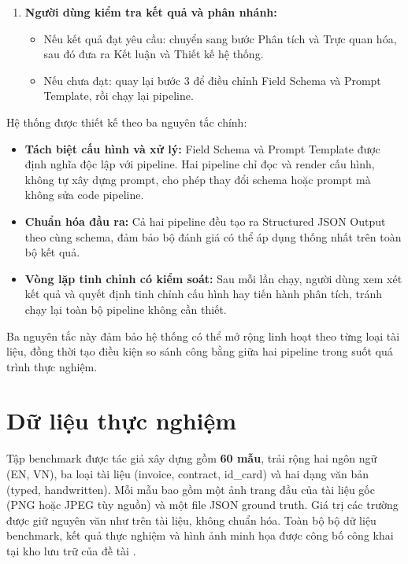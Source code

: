 ﻿\documentclass[12pt]{report}
\begin{document}
\begin{enumerate}
    \item \textbf{Người dùng kiểm tra kết quả và phân nhánh:}
    \begin{itemize}
        \item Nếu kết quả đạt yêu cầu: chuyển sang bước Phân tích và Trực quan hóa, sau đó đưa ra Kết luận và Thiết kế hệ thống.
        \item Nếu chưa đạt: quay lại bước 3 để điều chỉnh Field Schema và Prompt Template, rồi chạy lại pipeline.
    \end{itemize}
\end{enumerate}

Hệ thống được thiết kế theo ba nguyên tắc chính:

\begin{itemize}
    \item \textbf{Tách biệt cấu hình và xử lý:} Field Schema và Prompt Template được định nghĩa độc lập với pipeline. Hai pipeline chỉ đọc và render cấu hình, không tự xây dựng prompt, cho phép thay đổi schema hoặc prompt mà không sửa code pipeline.

    \item \textbf{Chuẩn hóa đầu ra:} Cả hai pipeline đều tạo ra Structured JSON Output theo cùng schema, đảm bảo bộ đánh giá có thể áp dụng thống nhất trên toàn bộ kết quả.

    \item \textbf{Vòng lặp tinh chỉnh có kiểm soát:} Sau mỗi lần chạy, người dùng xem xét kết quả và quyết định tinh chỉnh cấu hình hay tiến hành phân tích, tránh chạy lại toàn bộ pipeline không cần thiết.
\end{itemize}

Ba nguyên tắc này đảm bảo hệ thống có thể mở rộng linh hoạt theo từng loại tài liệu, đồng thời tạo điều kiện so sánh công bằng giữa hai pipeline trong suốt quá trình thực nghiệm.

\section{Dữ liệu thực nghiệm}\label{sec:datasets}

Tập benchmark được tác giả xây dựng gồm \textbf{60 mẫu}, trải rộng hai ngôn ngữ (EN, VN),
ba loại tài liệu (invoice, contract, id\_card) và hai dạng văn bản (typed, handwritten).
Mỗi mẫu bao gồm một ảnh trang đầu của tài liệu gốc (PNG hoặc JPEG tùy nguồn) và một file JSON ground truth.
Giá trị các trường được giữ nguyên văn như trên tài liệu, không chuẩn hóa. Toàn bộ bộ dữ liệu
benchmark, kết quả thực nghiệm và hình ảnh minh họa được công bố công khai tại kho lưu trữ của
đề tài \cite{pham2026repo}.
\end{document}

